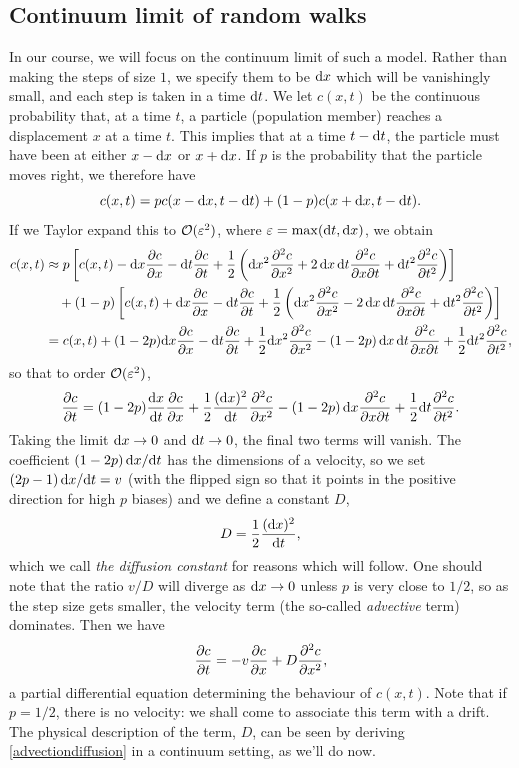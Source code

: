 \documentclass[main.tex]{subfiles}
\begin{document}
\subsection{Continuum limit of random walks}\label{sec:continuum-random}
In our course, we will focus on the continuum limit of such a model. Rather than making the steps of size $1$, we specify them to be $\mathrm{d} x$ which will be vanishingly small, and each step is taken in a time $\mathrm{d} t$. We let $c(x,t)$ be the continuous probability that, at a time $t$, a particle (population member) reaches a displacement $x$ at a time $t$. This implies that at a time $t-\mathrm{d} t$, the particle must have been at either $x-\mathrm{d} x$ or $x+\mathrm{d} x$. If $p$ is the probability that the particle moves right, we therefore have 
\begin{equation}
c(x,t)= p c(x-\mathrm{d} x,t-\mathrm{d} t) + (1-p) c(x+\mathrm{d} x,t-\mathrm{d} t).
\end{equation} 
If we Taylor expand this to $\mathcal{O}(\varepsilon^2)$, where $\varepsilon = \max(\mathrm{d} t,\mathrm{d} x)$, we obtain
\begin{align}
	c(x,t) &\approx p\left[c(x,t) - \d x \pd{c}{x} - \d t \pd{c}{t} + \frac{1}{2}\left( \d x^2 \pdd{c}{x} + 2 \, \d x \, \d t \pddmixed{c}{x}{t} + \d t^2 \pdd{c}{t} \right)\right] \\
	& \quad + (1-p)\left[c(x,t) + \d x \pd{c}{x} - \d t \pd{c}{t} + \frac{1}{2}\left( \d x^2 \pdd{c}{x} - 2 \, \d x \, \d t \pddmixed{c}{x}{t} + \d t^2 \pdd{c}{t} \right)\right] \nonumber\\
	&= c(x,t) + (1-2p)\d x \pd{c}{x} - \d t \pd{c}{t} + \frac{1}{2}\d x^2 \pdd{c}{x} - (1-2p)\, \d x \, \d t \pddmixed{c}{x}{t} + \frac12 \d t^2 \pdd{c}{t},
\end{align}
so that to order $\mathcal{O}(\varepsilon^2)$,
\begin{equation}
 \pd{c}{t} =  (1-2 p)\fd{x}{t}\pd{c}{x} + \frac12 \frac{(\d x)^2}{\d{t}} \pdd{c}{x} - (1-2p)\dx \pddmixed{c}{x}{t} + \frac12 \d t \pdd{c}{t}. 
\end{equation}
Taking the limit $\mathrm{d} x\to 0$ and $\mathrm{d} t\to 0$, the final two terms will vanish. The coefficient  $(1-2p)\,\fd{x}{t}$ has the dimensions of a velocity, so we set $(2p-1)\,\fd{x}{t} = v$ (with the flipped sign so that it points in the positive direction for high $p$ biases) and we define a constant $D$,
\begin{equation}
D = \frac12 \frac{(\mathrm{d} x)^2}{\mathrm{d} t},
\end{equation}
which we call \emph{the diffusion constant} for reasons which will follow. One should note that the ratio $v/D$ will diverge as $\mathrm{d} x \to 0$ unless $p$ is very close to $1/2$, so as the step size gets smaller, the velocity term (the so-called \emph{advective} term) dominates. Then we have 
\begin{equation}
\label{advectiondiffusion}
 \pd{c}{t} =  -v\pd{c}{x} + D \pdd{c}{x},
\end{equation}
a partial differential equation determining the behaviour of $c(x,t)$. Note that if $p=1/2$, there is no velocity: we shall come to associate this term with a drift. The physical description of the term, $D$, can be seen by deriving \cref{advectiondiffusion} in a continuum setting, as we'll do now.
  
\end{document}
